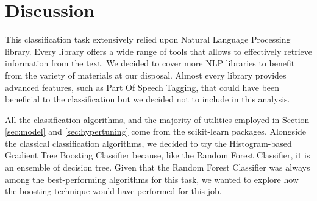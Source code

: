 \documentclass[conference]{IEEEtran}
\begin{document}
\section{Discussion}\label{sec:discussion}
This classification task extensively relied upon Natural Language Processing library. Every library offers a wide range of tools that allows to effectively retrieve information from the text. We decided to cover more NLP libraries to benefit from the variety of materials at our disposal. Almost every library provides advanced features, such as Part Of Speech Tagging, that could have been beneficial to the classification but we decided not to include in this analysis. 


All the classification algorithms, and the majority of utilities employed in Section \ref{sec:model} and \ref{sec:hypertuning} come from the scikit-learn packages\cite{scikit-learn}. Alongside the classical classification algorithms, we decided to try the Histogram-based Gradient Tree Boosting Classifier because, like the Random Forest Classifier, it is an ensemble of decision tree. Given that the Random Forest Classifier was always among the best-performing algorithms for this task, we wanted to explore how the boosting technique would have performed for this job.


\end{document}
